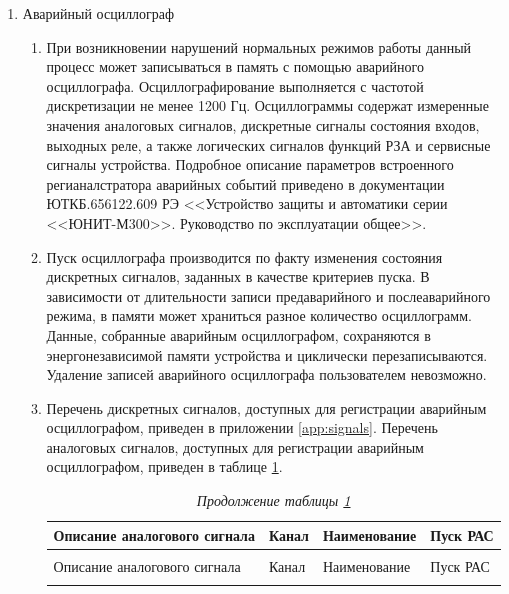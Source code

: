 \begin{enumerate}
\begin{enumerate}
\end{enumerate}

\item Аварийный осциллограф
\begin{enumerate}
\item
При возникновении нарушений нормальных режимов работы данный процесс может записываться в память с помощью аварийного осциллографа. Осциллографирование выполняется с частотой дискретизации не менее 1200 Гц. Осциллограммы содержат измеренные значения аналоговых сигналов, дискретные сигналы состояния входов, выходных реле, а также логических сигналов функций РЗА и сервисные сигналы устройства. Подробное описание параметров встроенного регианалстратора аварийных событий приведено в документации ЮТКБ.656122.609 РЭ <<Устройство защиты и автоматики серии <<ЮНИТ-М300>>. Руководство по эксплуатации общее>>.
\item
Пуск осциллографа производится по факту изменения состояния дискретных сигналов, заданных в качестве критериев пуска. В зависимости от длительности записи предаварийного и послеаварийного режима, в памяти может храниться разное количество осциллограмм. Данные, собранные аварийным осциллографом, сохраняются в энергонезависимой памяти устройства и циклически перезаписываются. Удаление записей аварийного осциллографа пользователем невозможно.

\item
Перечень дискретных сигналов, доступных для регистрации аварийным осциллографом, приведен в приложении \ref{app:signals}. Перечень аналоговых сигналов, доступных для регистрации аварийным осциллографом, приведен в таблице \ref{osz:tbl1}.


\setlength{\extrarowheight}{0.05cm}
\small
\begin{longtable}{|>{\centering\arraybackslash}m{6.8cm}|>{\centering\arraybackslash}m{2cm}|>{\centering\arraybackslash}m{5.3cm}|>{\centering\arraybackslash}m{2cm}|}
\caption{Перечень аналоговых сигналов, доступных для регистрации аварийным осциллографом\hfill\vspace{-0.5\baselineskip}}\label{osz:tbl1}\\ 
\hline
\rowcolor{gray!30}
Описание аналогового сигнала & Канал & Наименование  & Пуск РАС \\ 
\hline
\endfirsthead
\caption*{\hspace{3pt}\emph{Продолжение таблицы \ref{osz:tbl1}\hfill\vspace{-0.5\baselineskip}}} \\ %
\hline
\rowcolor{gray!30}
Описание аналогового сигнала & Канал & Наименование  & Пуск РАС \\ 
\endhead
\endfoot
\endlastfoot


\end{longtable}
\end{enumerate}
\end{enumerate}
